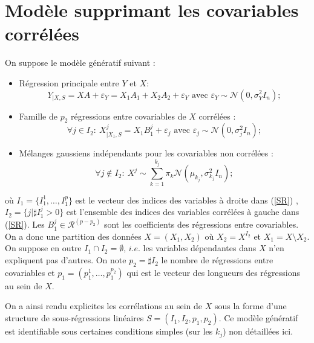 \documentclass[12pt]{article}
\begin{document}
\section{Modèle supprimant les covariables corrélées}		
	On suppose le modèle génératif suivant :
	\begin{itemize}
		\item Régression principale entre $Y$ et $X$:
			 \begin{equation}
			 	Y_{|X,S}=XA+\varepsilon_Y= X_1A_{1}+X_2A_{2}+\varepsilon_Y \textrm{ avec } \varepsilon_Y \sim \mathcal{N}(0,\sigma_Y^2I_n); \label{MainR}
			 \end{equation}
		\item Famille de $p_2$ régressions entre covariables de $X$ corrélées :
			\begin{equation}
			\forall j \in I_2 : \  X^j_{|X_1,S}=X_1B_{1}^j + \varepsilon_{j} \textrm{ avec } \varepsilon_j \sim \mathcal{N}(0,\sigma_j^2I_n); \label{SR}
			\end{equation}
		\item Mélanges gaussiens indépendants pour les covariables non corrélées :
			\begin{equation}
				\forall j \notin I_2 : \ X^j \sim \sum_{k=1}^{k_j}\pi_k\mathcal{N}(\mu_{k_j},\sigma_{k_j}^2I_n);
			\end{equation}
	\end{itemize}
	où %
$I_1=\{I_1^1,\dots,I_1^{p}\}$ est le vecteur des indices des variables à droite dans (\ref{SR}) ,  $I_2=\{j |\sharp I_1^j>0 \}$ est l'ensemble des indices des variables corrélées à gauche dans (\ref{SR}). Les $B_1^j \in \mathcal{R}^{(p-p_2)}$ sont les coefficients des régressions entre covariables. On a donc une partition des données $X=(X_1,X_2)$ où $X_2=X^{I_2}$ et $X_1=X\setminus X_2$.
On suppose en outre $I_1\cap I_2=\emptyset$, $i.e.$ les variables dépendantes dans $X$ n'en expliquent pas d'autres.
On note $p_2= \sharp I_2$ le nombre de régressions entre covariables et $p_1=(p_1^1,\dots,p_1^{p_2})$ qui est le vecteur des longueurs des régressions au sein de $X$.
	
On a ainsi rendu explicites les corrélations au sein de $X$ sous la forme d'une structure de sous-régressions linéaires $S=(I_1,I_2,p_1,p_2)$.	
Ce modèle génératif est identifiable sous certaines conditions simples (sur les $k_j$) non détaillées ici.
\end{document}
